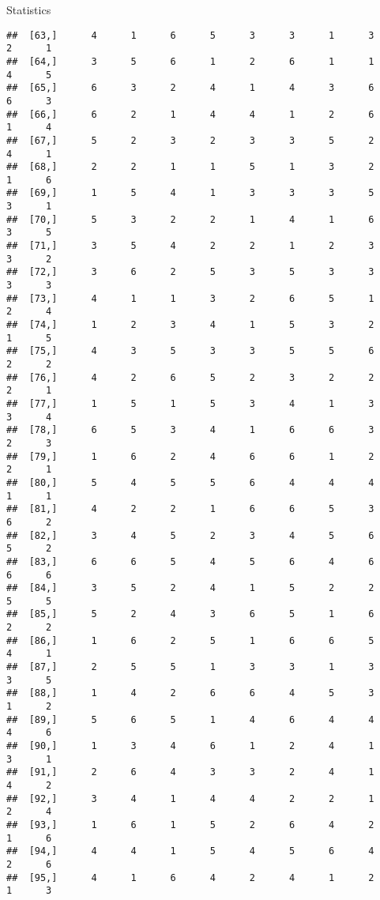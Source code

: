 \documentclass[
  ignorenonframetext,
]{beamer}
\begin{document}
\begin{frame}[fragile]{Statistics}
\begin{verbatim}
##  [63,]      4      1      6      5      3      3      1      3      2      1
##  [64,]      3      5      6      1      2      6      1      1      4      5
##  [65,]      6      3      2      4      1      4      3      6      6      3
##  [66,]      6      2      1      4      4      1      2      6      1      4
##  [67,]      5      2      3      2      3      3      5      2      4      1
##  [68,]      2      2      1      1      5      1      3      2      1      6
##  [69,]      1      5      4      1      3      3      3      5      3      1
##  [70,]      5      3      2      2      1      4      1      6      3      5
##  [71,]      3      5      4      2      2      1      2      3      3      2
##  [72,]      3      6      2      5      3      5      3      3      3      3
##  [73,]      4      1      1      3      2      6      5      1      2      4
##  [74,]      1      2      3      4      1      5      3      2      1      5
##  [75,]      4      3      5      3      3      5      5      6      2      2
##  [76,]      4      2      6      5      2      3      2      2      2      1
##  [77,]      1      5      1      5      3      4      1      3      3      4
##  [78,]      6      5      3      4      1      6      6      3      2      3
##  [79,]      1      6      2      4      6      6      1      2      2      1
##  [80,]      5      4      5      5      6      4      4      4      1      1
##  [81,]      4      2      2      1      6      6      5      3      6      2
##  [82,]      3      4      5      2      3      4      5      6      5      2
##  [83,]      6      6      5      4      5      6      4      6      6      6
##  [84,]      3      5      2      4      1      5      2      2      5      5
##  [85,]      5      2      4      3      6      5      1      6      2      2
##  [86,]      1      6      2      5      1      6      6      5      4      1
##  [87,]      2      5      5      1      3      3      1      3      3      5
##  [88,]      1      4      2      6      6      4      5      3      1      2
##  [89,]      5      6      5      1      4      6      4      4      4      6
##  [90,]      1      3      4      6      1      2      4      1      3      1
##  [91,]      2      6      4      3      3      2      4      1      4      2
##  [92,]      3      4      1      4      4      2      2      1      2      4
##  [93,]      1      6      1      5      2      6      4      2      1      6
##  [94,]      4      4      1      5      4      5      6      4      2      6
##  [95,]      4      1      6      4      2      4      1      2      1      3

\end{verbatim}
\end{frame}
\end{document}
